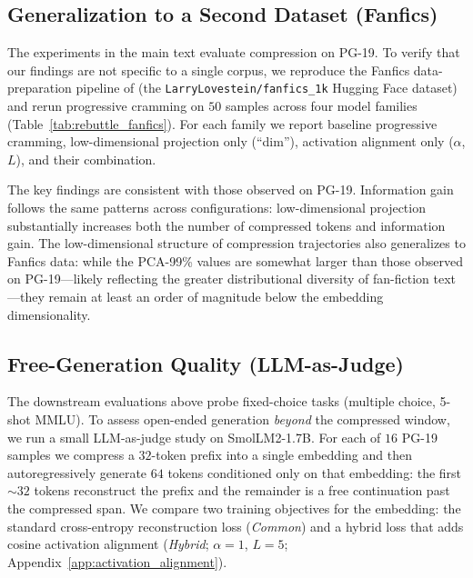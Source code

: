 \subsection{Generalization to a Second Dataset (Fanfics)}
\label{app:fanfics}

The experiments in the main text evaluate compression on PG-19. To verify that our findings are not specific to a single corpus, we reproduce the Fanfics data-preparation pipeline of \citet{kuratov2025cramming} (the \texttt{LarryLovestein/fanfics\_1k} Hugging Face dataset) and rerun progressive cramming on $50$ samples across four model families (Table~\ref{tab:rebuttle_fanfics}). For each family we report baseline progressive cramming, low-dimensional projection only (``dim''), activation alignment only ($\alpha$, $L$), and their combination.

The key findings are consistent with those observed on PG-19. Information gain follows the same patterns across configurations: low-dimensional projection substantially increases both the number of compressed tokens and information gain. The low-dimensional structure of compression trajectories also generalizes to Fanfics data: while the PCA-99\% values are somewhat larger than those observed on PG-19---likely reflecting the greater distributional diversity of fan-fiction text---they remain at least an order of magnitude below the embedding dimensionality.

\begin{table}[t]
    \centering
    \caption{Progressive cramming variants and key metrics across model families on \textbf{50 samples} of the \textbf{Fanfics} dataset following \citet{kuratov2025cramming} (\texttt{LarryLovestein/fanfics\_1k}). For each family we report baseline progressive cramming, low-dimensional projection only (``dim''), activation alignment only ($\alpha$, $L$), and their combination.}
    \label{tab:rebuttle_fanfics}
    \begin{small}
    
    \end{small}
\vskip -0.1in
\end{table}

\subsection{Free-Generation Quality (LLM-as-Judge)}
\label{app:llm_judge}

The downstream evaluations above probe fixed-choice tasks (multiple choice, 5-shot MMLU). To assess open-ended generation \emph{beyond} the compressed window, we run a small LLM-as-judge study on SmolLM2-1.7B. For each of $16$ PG-19 samples we compress a $32$-token prefix into a single embedding and then autoregressively generate $64$ tokens conditioned only on that embedding: the first ${\sim}32$ tokens reconstruct the prefix and the remainder is a free continuation past the compressed span. We compare two training objectives for the embedding: the standard cross-entropy reconstruction loss (\emph{Common}) and a hybrid loss that adds cosine activation alignment (\emph{Hybrid}; $\alpha=1$, $L=5$; Appendix~\ref{app:activation_alignment}).

